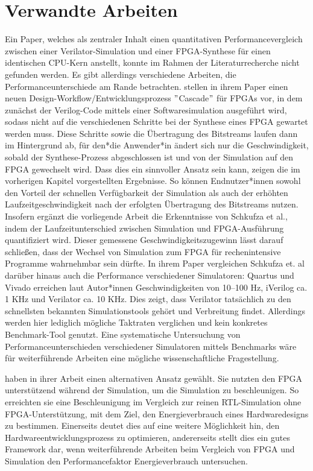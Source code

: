 \chapter{Verwandte Arbeiten}

Ein Paper, welches als zentraler Inhalt einen quantitativen Performancevergleich zwischen einer Verilator-Simulation und einer FPGA-Synthese für einen identischen CPU-Kern anstellt, konnte im Rahmen der Literaturrecherche nicht gefunden werden.
Es gibt allerdings verschiedene Arbeiten, die Performanceunterschiede am Rande betrachten.
\textcite{schkufza2019just} stellen in ihrem Paper einen neuen Design-Workflow/Entwicklungsprozess \("\)Cascade\("\) für FPGAs vor, in dem zunächst der Verilog-Code mittels einer Softwaresimulation ausgeführt wird, sodass nicht auf die verschiedenen Schritte bei der Synthese eines FPGA gewartet werden muss.
Diese Schritte sowie die Übertragung des Bitstreams laufen dann im Hintergrund ab, für den*die Anwender*in ändert sich nur die Geschwindigkeit, sobald der Synthese-Prozess abgeschlossen ist und von der Simulation auf den FPGA gewechselt wird.
Dass dies ein sinnvoller Ansatz sein kann, zeigen die im vorherigen Kapitel vorgestellten Ergebnisse.
So können Endnutzer*innen sowohl den Vorteil der schnellen Verfügbarkeit der Simulation als auch der erhöhten Laufzeitgeschwindigkeit nach der erfolgten Übertragung des Bitstreams nutzen.
Insofern ergänzt die vorliegende Arbeit die Erkenntnisse von Schkufza et al., indem der Laufzeitunterschied zwischen Simulation und FPGA-Ausführung quantifiziert wird.
Dieser gemessene Geschwindigkeitszugewinn lässt darauf schließen, dass der Wechsel von Simulation zum FPGA für rechenintensive Programme wahrnehmbar sein dürfte.
In ihrem Paper vergleichen Schkufza et. al darüber hinaus auch die Performance verschiedener Simulatoren:
Quartus und Vivado erreichen laut Autor*innen Geschwindigkeiten von 10–100 Hz, iVerilog ca. 1 KHz und Verilator ca. 10 KHz.
Dies zeigt, dass Verilator tatsächlich zu den schnellsten bekannten Simulationstools gehört und Verbreitung findet.
Allerdings werden hier lediglich mögliche Taktraten verglichen und kein konkretes Benchmark-Tool genutzt.
Eine systematische Untersuchung von Performanceunterschieden verschiedener Simulatoren mittels Benchmarks wäre für weiterführende Arbeiten eine mögliche wissenschaftliche Fragestellung.

\textcite{kim2016strober} haben in ihrer Arbeit einen alternativen Ansatz gewählt.
Sie nutzten den FPGA unterstützend während der Simulation, um die Simulation zu beschleunigen.
So erreichten sie eine Beschleunigung im Vergleich zur reinen RTL-Simulation ohne FPGA-Unterstützung, mit dem Ziel, den Energieverbrauch eines Hardwaredesigns zu bestimmen.
Einerseits deutet dies auf eine weitere Möglichkeit hin, den Hardwareentwicklungsprozess zu optimieren, andererseits stellt dies ein gutes Framework dar, wenn weiterführende Arbeiten beim Vergleich von FPGA und Simulation den Performancefaktor Energieverbrauch untersuchen.

